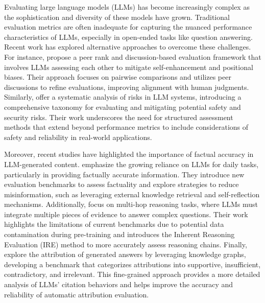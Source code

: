 Evaluating large language models (LLMs) has become increasingly complex as the sophistication and diversity of these models have grown. Traditional evaluation metrics are often inadequate for capturing the nuanced performance characteristics of LLMs, especially in open-ended tasks like question answering. Recent work has explored alternative approaches to overcome these challenges. For instance, \cite{prd2023}\cite{lamport1994latex} propose a peer rank and discussion-based evaluation framework that involves LLMs assessing each other to mitigate self-enhancement and positional biases. Their approach focuses on pairwise comparisons and utilizes peer discussions to refine evaluations, improving alignment with human judgments. Similarly, \cite{risk_taxonomy2024}\cite{hagrid2023}\cite{rarr2022} offer a systematic analysis of risks in LLM systems, introducing a comprehensive taxonomy for evaluating and mitigating potential safety and security risks. Their work underscores the need for structured assessment methods that extend beyond performance metrics to include considerations of safety and reliability in real-world applications.

Moreover, recent studies have highlighted the importance of factual accuracy in LLM-generated content. \cite{factuality_2024}\cite{verifiability2023} emphasize the growing reliance on LLMs for daily tasks, particularly in providing factually accurate information. They introduce new evaluation benchmarks to assess factuality and explore strategies to reduce misinformation, such as leveraging external knowledge retrieval and self-reflection mechanisms. Additionally, \cite{multihop_reasoning2024}\cite{automatic_eval2023} focus on multi-hop reasoning tasks, where LLMs must integrate multiple pieces of evidence to answer complex questions. Their work highlights the limitations of current benchmarks due to potential data contamination during pre-training and introduces the Inherent Reasoning Evaluation (IRE) method to more accurately assess reasoning chains. Finally, \cite{benchmarking_llms_2024}\cite{attributed_qa2022} explore the attribution of generated answers by leveraging knowledge graphs, developing a benchmark that categorizes attributions into supportive, insufficient, contradictory, and irrelevant. This fine-grained approach provides a more detailed analysis of LLMs' citation behaviors and helps improve the accuracy and reliability of automatic attribution evaluation.

